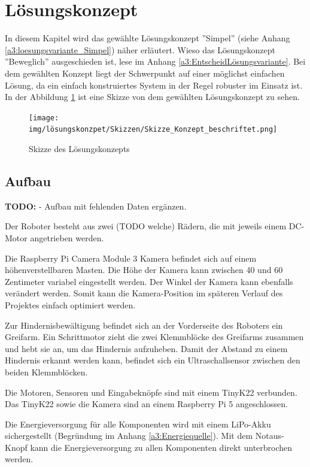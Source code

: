 \documentclass[../main.tex]{subfiles}
\begin{document}
\newpage
\section{Lösungskonzept}

In diesem Kapitel wird das gewählte Lösungskonzept ''Simpel'' (siehe Anhang \ref{a3:loesungsvariante_Simpel}) näher erläutert. Wieso das Lösungskonzept ''Beweglich'' ausgeschieden ist, lese im Anhang \ref{a3:EntscheidLösungsvariante}. Bei dem gewählten Konzept liegt der Schwerpunkt auf einer möglichst einfachen Lösung, da ein einfach konstruiertes System in der Regel robuster im Einsatz ist. In der Abbildung \ref{img:Konzept-Skizze_Fahrzeug} ist eine Skizze von dem gewählten Lösungskonzept zu sehen.

\begin{figure}[H]
\centering
\texttt{[image: img/lösungskonzpet/Skizzen/Skizze\_Konzept\_beschriftet.png]}
\caption{Skizze des Lösungskonzepts}
\label{img:Konzept-Skizze_Fahrzeug}
\end{figure}

\subsection{Aufbau}

\textbf{TODO:} 
- Aufbau mit fehlenden Daten ergänzen.  


Der Roboter besteht aus zwei (TODO welche) Rädern, die mit jeweils einem DC-Motor angetrieben werden.

Die Raspberry Pi Camera Module 3 Kamera befindet sich auf einem höhenverstellbaren Masten. Die Höhe der Kamera kann zwischen 40 und 60 Zentimeter variabel eingestellt werden. Der Winkel der Kamera kann ebenfalls verändert werden. Somit kann die Kamera-Position im späteren Verlauf des Projektes einfach optimiert werden.

Zur Hindernisbewältigung befindet sich an der Vorderseite des Roboters ein Greifarm. Ein Schrittmotor zieht die zwei Klemmblöcke des Greifarms zusammen und hebt sie an, um das Hindernis aufzuheben. Damit der Abstand zu einem Hindernis erkannt werden kann, befindet sich ein Ultraschallsensor zwischen den beiden Klemmblöcken. 

Die Motoren, Sensoren und Eingabeknöpfe sind mit einem TinyK22 verbunden.
Das TinyK22 sowie die Kamera sind an einem Raspberry Pi 5 angeschlossen.

Die Energieversorgung für alle Komponenten wird mit einem LiPo-Akku sichergestellt (Begründung im Anhang \ref{a3:Energiequelle}).
Mit dem Notaus-Knopf kann die Energieversorgung zu allen Komponenten direkt unterbrochen werden.
\newpage
\end{document}
